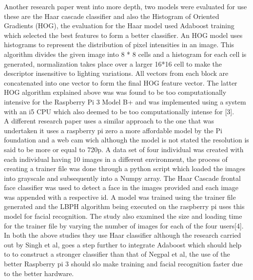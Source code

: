 \documentclass[journal]{IEEEtran}
\begin{document}
Another research paper went into more depth, two models were evaluated for use these are the Haar cascade classifier and also the Histogram of Oriented Gradients (HOG), the evaluation for the Haar model used Adaboost training which selected the best features to form a better classifier. An HOG model uses histograms to represent the distribution of pixel intensities in an image. This algorithm divides the given image into 8 * 8 cells and a histogram for each cell is generated, normalization takes place over a larger 16*16 cell to make the descriptor insensitive to lighting variations. All vectors from each block are concatenated into one vector to form the final HOG feature vector. The latter HOG algorithm explained above was was found to be too computationally intensive for the Raspberry Pi 3 Model B+ and was implemented using a system with an i5 CPU which also deemed to be too computationally intense for [3].\\

A different research paper uses a similar approach to the one that was undertaken it uses a raspberry pi zero a more affordable model by the Pi foundation and a web cam wich although the model is not stated the resolution is said to be more or equal to 720p. A data set of four individual was created with each individual having 10 images in a different environment, the process of creating a trainer file was done through a python script which loaded the images into grayscale and subsequently into a Numpy array. The Haar Cascade frontal face classifier was used to detect a face in the images provided and each image was appended with a respective id. A model was trained using the trainer file generated and the LBPH algorithm being executed on the raspberry pi uses this model for facial recognition. The study also examined the size and loading time for the trainer file by varying the number of images for each of the four users[4].\\

In both the above studies they use Haar classifier although the research carried out by Singh et al, goes a step further to integrate Adaboost which should help to to construct a stronger classifier than that of Negpal et al, the use of the better Raspberry pi 3 should slo make training and facial recognition faster due to the better hardware.\\
\end{document}
